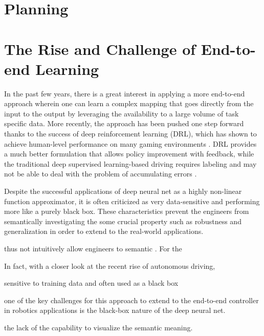 \documentclass[../thesis.tex]{subfiles}
\begin{document}

\section{Planning}


\section{The Rise and Challenge of End-to-end Learning}

In the past few years, there is a great interest in applying a more end-to-end approach \cite{deepdriving,nvidiacar,endtoendcars} wherein one can learn a complex mapping that goes directly from the input to the output by leveraging the availability to a large volume of task specific data. More recently, the approach has been pushed one step forward thanks to the success of deep reinforcement learning (DRL), which has shown to achieve human-level performance on many gaming environments \cite{mnih2013playing, mnih2015human,2016-TOG-deepRL}. DRL provides a much better formulation that allows policy improvement with feedback, while the traditional deep supervised learning-based driving requires labeling and may not be able to deal with the problem of accumulating errors \cite{ross2011reduction}. 

Despite the successful applications of deep neural net as a highly non-linear function approximator, it is often criticized as very data-sensitive and performing more like a purely black box. These characteristics prevent the engineers from semantically investigating the some crucial property such as robustness and generalization in order to extend 
to the real-world applications.


thus not intuitively allow engineers to semantic 
. For the 

In fact, with a closer look at the recent rise of autonomous driving, 

sensitive to training data and often used as a black box 

one of the key challenges for this approach to extend to the end-to-end controller in robotics applications is the black-box nature of the deep neural net.

the lack of the capability to visualize the semantic meaning. 
\end{document}
